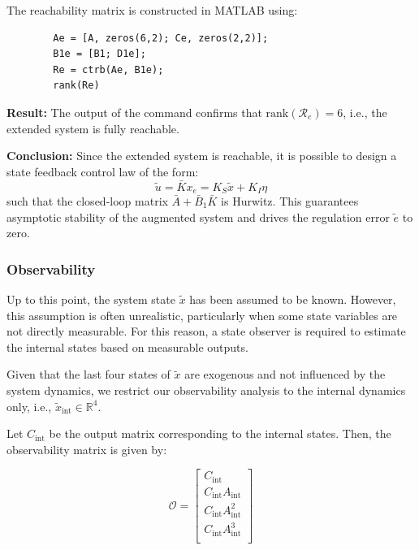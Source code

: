 \documentclass[]{report}
\begin{document}
	The reachability matrix is constructed in MATLAB using:
	
	\begin{verbatim}
		Ae = [A, zeros(6,2); Ce, zeros(2,2)];
		B1e = [B1; D1e];
		Re = ctrb(Ae, B1e);
		rank(Re)
	\end{verbatim}
	
	\textbf{Result:}  
	The output of the command confirms that $\text{rank}(\mathcal{R}_e) = 6$, i.e., the extended system is fully reachable.
	
	\textbf{Conclusion:}  
	Since the extended system is reachable, it is possible to design a state feedback control law of the form:
	\begin{equation}
		\tilde{u} = \bar{K} x_e = K_S \tilde{x} + K_I \eta
	\end{equation}
	such that the closed-loop matrix $\bar{A} + \bar{B}_1 \bar{K}$ is Hurwitz. This guarantees asymptotic stability of the augmented system and drives the regulation error $\tilde{e}$ to zero.
	
	
	
	
\subsubsection{Observability}

Up to this point, the system state $\tilde{x}$ has been assumed to be known. However, this assumption is often unrealistic, particularly when some state variables are not directly measurable. For this reason, a state observer is required to estimate the internal states based on measurable outputs.

Given that the last four states of $\tilde{x}$ are exogenous and not influenced by the system dynamics, we restrict our observability analysis to the internal dynamics only, i.e., $\tilde{x}_{\text{int}} \in \mathbb{R}^4$.

Let $C_{\text{int}}$ be the output matrix corresponding to the internal states. Then, the observability matrix is given by:

\begin{equation}
	\mathcal{O} = \begin{bmatrix}
		C_{\text{int}} \\
		C_{\text{int}} A_{\text{int}} \\
		C_{\text{int}} A_{\text{int}}^2 \\
		C_{\text{int}} A_{\text{int}}^3 \\
	\end{bmatrix}
\end{equation}
\end{document}
